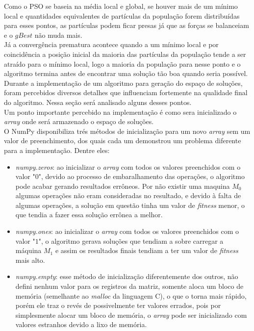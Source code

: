 Como o PSO se baseia na média local e global, se houver mais de um mínimo local e quantidades equivalentes de partículas da população forem distribuídas para esses pontos, as partículas podem ficar presas já que as forças se balanceiam e o $gBest$ não muda mais.\\
%
\indent Já a convergência prematura acontece quando a um mínimo local e por coincidência a posição inicial da maioria das partículas da população tende a ser atraído para o mínimo local, logo a maioria da população para nesse ponto e o algoritmo termina antes de encontrar uma solução tão boa quando seria possível.\\
\indent Durante a implementação de um algoritmo para geração do espaço de soluções, foram percebidos diversos detalhes que influenciam fortemente na qualidade final do algoritmo. Nessa seção será analisado alguns desses pontos.\\
\indent Um ponto importante percebido na implementação é como sera inicializado o \textit{array} onde será armazenado o espaço de soluções.\\
\indent O NumPy disponibiliza trés métodos de inicialização para um novo \textit{array} sem um valor de preenchimento, dos quais cada um demonstrou um problema diferente para a implementação. Dentre eles: 
\begin{itemize}
    \item \textit{numpy.zeros}: ao inicializar o \textit{array} com todos os valores preenchidos com o valor "$0$", devido ao processo de embaralhamento das operações, o algoritmo pode acabar gerando resultados errôneos. Por não existir uma maquina $M_0$ algumas operações não eram consideradas no resultado, e devido à falta de algumas operações, a solução em questão tinha um valor de \textit{fitness} menor, o que tendia a fazer essa solução errônea a melhor.

    \item \textit{numpy.ones}: ao inicializar o \textit{array} com todos os valores preenchidos com o valor "$1$", o algoritmo gerava soluções que tendiam a sobre carregar a máquina $M_1$ e assim os resultados finais tendiam a ter um valor de \textit{fitness} mais alto.

    \item \textit{numpy.empty}: esse método de inicialização diferentemente dos outros, não defini nenhum valor para os registros da matriz, somente aloca um bloco de memória (semelhante ao \textit{malloc} da linguagem C), o que o torna mais rápido, porém ele traz o revés de possivelmente ter valores errados, pois por simplesmente alocar um bloco de memória, o \textit{array} pode ser inicializado com valores estranhos devido a lixo de memória.
\end{itemize}


